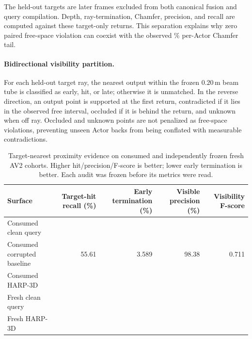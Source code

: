 The held-out targets are later frames excluded from both canonical fusion and query compilation. Depth, ray-termination, Chamfer,
precision, and recall are computed against these target-only returns. This separation explains why zero paired free-space violation
can coexist with the observed \PthreeActorWorse{}\% per-Actor Chamfer tail.

\paragraph{Bidirectional visibility partition.}
For each held-out target ray, the nearest output within the frozen $0.20$\,m beam tube is classified as early, hit, or late;
otherwise it is unmatched. In the reverse direction, an output point is supported at the first return, contradicted if it lies in
the observed free interval, occluded if it is behind the return, and unknown when off ray. Occluded and unknown points are not
penalized as free-space violations, preventing unseen Actor backs from being conflated with measurable contradictions.

\begin{table}[!t]
\centering
\small
\caption{Target-nearest proximity evidence on consumed and independently frozen fresh AV2 cohorts. Higher
hit/precision/F-score is better; lower early termination is better. Each audit was frozen before its metrics were read.}
\begin{tabular}{lrrrr}
\toprule
Surface & Target-hit recall (\%) & Early termination (\%) & Visible precision (\%) & Visibility F-score \\
\midrule
Consumed clean query & \PthreeCQueryHit{} & \PthreeCQueryEarly{} & \PthreeCQueryPrecision{} & \PthreeCQueryFscore{} \\
Consumed corrupted baseline & 55.61 & 3.589 & 98.38 & 0.711 \\
Consumed HARP-3D & \PthreeCCompiledHit{} & \PthreeCCompiledEarly{} & \PthreeCCompiledPrecision{} & \PthreeCCompiledFscore{} \\
Fresh clean query & \PthreeFreshQueryHit{} & \PthreeFreshQueryEarly{} & \PthreeFreshQueryPrecision{} & \PthreeFreshQueryFscore{} \\
Fresh HARP-3D & \PthreeFreshCompiledHit{} & \PthreeFreshCompiledEarly{} & \PthreeFreshCompiledPrecision{} & \PthreeFreshCompiledFscore{} \\
\bottomrule
\end{tabular}
\label{legacy:tab:supp-visibility}
\end{table}


